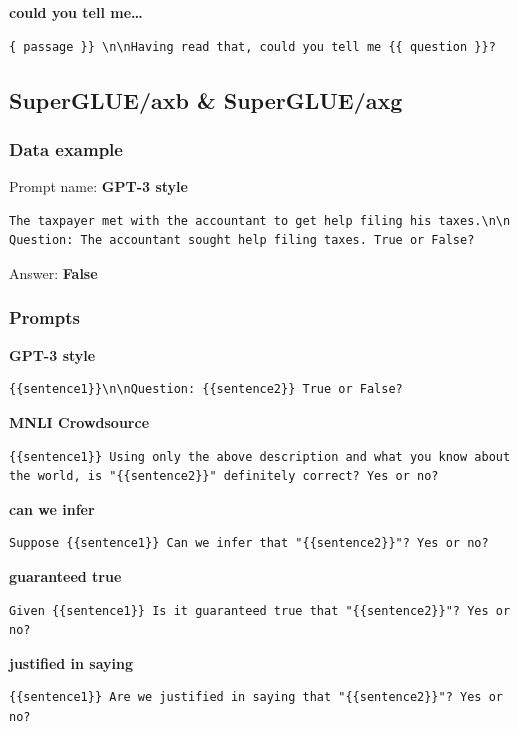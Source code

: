 \documentclass[twoside,11pt]{article}
\begin{document}
\noindent\textbf{could you tell me…}
\begin{verbatim}
{ passage }} \n\nHaving read that, could you tell me {{ question }}?
\end{verbatim}

\subsection{SuperGLUE/axb \& SuperGLUE/axg}

\subsubsection{Data example}

Prompt name: \textbf{GPT-3 style}
\begin{verbatim}
The taxpayer met with the accountant to get help filing his taxes.\n\n
Question: The accountant sought help filing taxes. True or False?
\end{verbatim}
Answer: \textbf{False}

\subsubsection{Prompts}

\noindent\textbf{GPT-3 style}
\begin{verbatim}
{{sentence1}}\n\nQuestion: {{sentence2}} True or False?
\end{verbatim}

\noindent\textbf{MNLI Crowdsource}
\begin{verbatim}
{{sentence1}} Using only the above description and what you know about 
the world, is "{{sentence2}}" definitely correct? Yes or no?
\end{verbatim}

\noindent\textbf{can we infer}
\begin{verbatim}
Suppose {{sentence1}} Can we infer that "{{sentence2}}"? Yes or no?
\end{verbatim}

\noindent\textbf{guaranteed true}
\begin{verbatim}
Given {{sentence1}} Is it guaranteed true that "{{sentence2}}"? Yes or no?
\end{verbatim}

\noindent\textbf{justified in saying}
\begin{verbatim}
{{sentence1}} Are we justified in saying that "{{sentence2}}"? Yes or no?
\end{verbatim}
\end{document}
